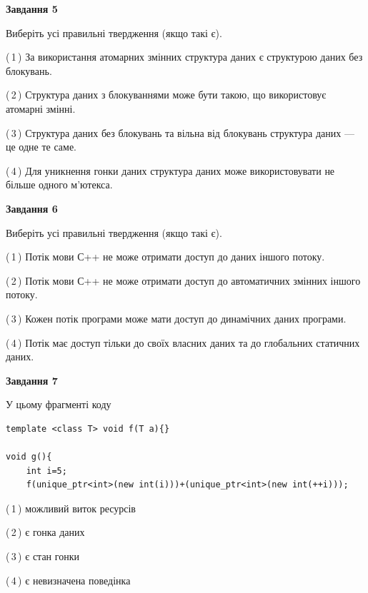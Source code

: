 \documentclass[12pt, ukrainian]{article}
\begin{document}
\begin {large}
{\begin{center}
\textbf{Завдання 5}
\end{center}

Виберіть усі правильні твердження (якщо такі є).\par
\vspace{2mm}

(\,1\,) За використання атомарних змінних структура даних є структурою даних без блокувань.%

(\,2\,) Структура даних з блокуваннями може бути такою, що використовує атомарні змінні.%

(\,3\,) Структура даних без блокувань та вільна від блокувань структура даних --- це одне те саме.%

(\,4\,) Для уникнення гонки даних структура даних може використовувати не більше одного м’ютекса.%
\newpage


\begin{center}
\textbf{Завдання 6}
\end{center}

Виберіть усі правильні твердження (якщо такі є).\par
\vspace{2mm}

(\,1\,) Потік мови С++ не може отримати доступ до даних іншого потоку.%

(\,2\,) Потік мови С++ не може отримати доступ до автоматичних змінних іншого потоку.%

(\,3\,) Кожен потік програми може мати доступ до динамічних даних програми.%

(\,4\,) Потік має доступ тільки до своїх власних даних та до глобальних статичних даних.%


\begin{center}
\textbf{Завдання 7}
\end{center}

У цьому фрагменті коду
\begin{verbatim}
template <class T> void f(T a){}

void g(){
    int i=5;
    f(unique_ptr<int>(new int(i)))+(unique_ptr<int>(new int(++i)));
\end{verbatim}
(\,1\,) можливий виток ресурсів%

(\,2\,) є гонка даних%

(\,3\,) є стан гонки%

(\,4\,) є невизначена поведінка%

}
\end {large}

\vspace{4mm}
\newpage
\end{document}
